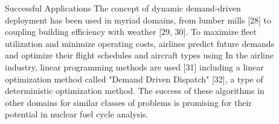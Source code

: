 \documentclass[final]{beamer}
\newlength{\sepwid}
\newlength{\onecolwid}
\newlength{\twocolwid}
\begin{document}
\begin{frame}[t]
\begin{columns}[t]
\begin{column}{\twocolwid}
\begin{columns}[t,totalwidth=\twocolwid]
\begin{column}{\onecolwid}
\begin{block}{Successful Applications}
The concept of dynamic demand-driven deployment has been used in myriad domains, 
from lumber mills [28] to coupling building efficiency with weather [29, 30].  
To maximize fleet utilization and minimize operating costs, airlines predict future 
demands and optimize their flight schedules and aircraft types using In the airline industry, 
linear programming methods are used [31] including a linear optimization method called 
"Demand Driven Dispatch" [32], a type of deterministic optimization method.
The success of these algorithms in other domains for similar classes 
of problems is promising for their potential in nuclear fuel cycle analysis.

\end{block}


\end{column} %

\end{columns} %

\end{column} %

\begin{column}{\sepwid}\end{column} %

\begin{column}{\onecolwid} %



\end{column}
\end{columns}
\end{frame}
\end{document}
